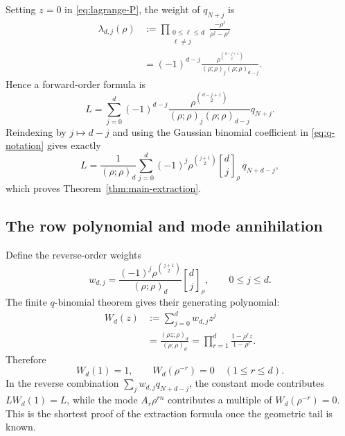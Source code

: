 \documentclass[11pt]{article}
\newcommand{\qbinom}[3]{\genfrac{[}{]}{0pt}{}{#1}{#2}_{#3}}
\newcommand{\poch}[3]{\left(#1;#2\right)_{#3}}
\begin{document}
Setting $z=0$ in \eqref{eq:lagrange-P}, the weight of $q_{N+j}$ is
\begin{align}
 \lambda_{d,j}(\rho)
 &:=\prod_{\substack{0\le\ell\le d\\\ell\ne j}}
 \frac{-\rho^\ell}{\rho^j-\rho^\ell} \\
 &=(-1)^{d-j}
 \frac{\rho^{\binom{d-j+1}{2}}}
 {\poch{\rho}{\rho}{j}\poch{\rho}{\rho}{d-j}}.
 \label{eq:forward-lagrange-weight}
\end{align}
Hence a forward-order formula is
\begin{equation}
 L=\sum_{j=0}^{d}(-1)^{d-j}
 \frac{\rho^{\binom{d-j+1}{2}}}
 {\poch{\rho}{\rho}{j}\poch{\rho}{\rho}{d-j}}q_{N+j}.
 \label{eq:forward-extraction}
\end{equation}
Reindexing by $j\mapsto d-j$ and using the Gaussian binomial coefficient in
\eqref{eq:q-notation} gives exactly
\begin{equation}
 L=\frac{1}{\poch{\rho}{\rho}{d}}
 \sum_{j=0}^{d}(-1)^j\rho^{\binom{j+1}{2}}
 \qbinom{d}{j}{\rho}\,q_{N+d-j},
 \label{eq:qbinomial-extraction-again}
\end{equation}
which proves Theorem~\ref{thm:main-extraction}.

\subsection{The row polynomial and mode annihilation}

Define the reverse-order weights
\begin{equation}
 w_{d,j}=\frac{(-1)^j\rho^{\binom{j+1}{2}}}
 {\poch{\rho}{\rho}{d}}\qbinom{d}{j}{\rho},
 \qquad 0\le j\le d.
 \label{eq:wdj}
\end{equation}
The finite $q$-binomial theorem \cite{gasperrahman} gives their generating polynomial:
\begin{align}
 W_d(z)
 &:=\sum_{j=0}^{d}w_{d,j}z^j \\
 &=\frac{\poch{\rho z}{\rho}{d}}
 {\poch{\rho}{\rho}{d}}
 =\prod_{r=1}^{d}\frac{1-\rho^rz}{1-\rho^r}.
 \label{eq:row-polynomial}
\end{align}
Therefore
\begin{equation}
 W_d(1)=1,
 \qquad
 W_d(\rho^{-r})=0\quad(1\le r\le d).
 \label{eq:row-roots}
\end{equation}
In the reverse combination $\sum_jw_{d,j}q_{N+d-j}$, the constant mode
contributes $LW_d(1)=L$, while the mode $A_r\rho^{rn}$ contributes a multiple
of $W_d(\rho^{-r})=0$.  This is the shortest proof of the extraction formula
once the geometric tail is known.
\end{document}
